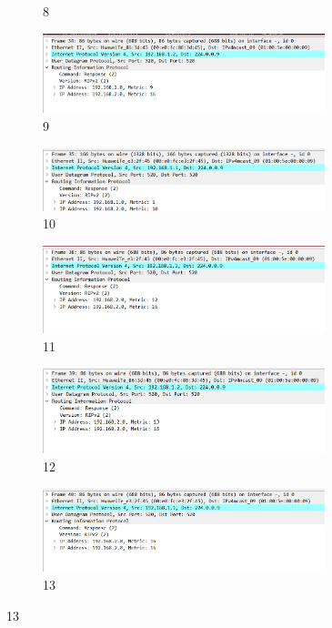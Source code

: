 \documentclass[a4paper,twoside]{article}
\begin{document}
\begin{spacing}{1.2}
\begin{figure}[bp]
\begin{subfigure}{0.4\textwidth}
		\caption{8}
		\label{fig:cti8}
	\end{subfigure}
	\begin{subfigure}{0.4\textwidth}
		\centering
		\includegraphics[width=0.9\textwidth]{9.png}
		\caption{9}
		\label{fig:cti9}
	\end{subfigure}
	\begin{subfigure}{0.4\textwidth}
		\centering
		\includegraphics[width=0.9\textwidth]{10.png}
		\caption{10}
		\label{fig:cti10}
	\end{subfigure}
	\begin{subfigure}{0.4\textwidth}
		\centering
		\includegraphics[width=0.9\textwidth]{11.png}
		\caption{11}
		\label{fig:cti11}
	\end{subfigure}
	\begin{subfigure}{0.4\textwidth}
		\centering
		\includegraphics[width=0.9\textwidth]{12.png}
		\caption{12}
		\label{fig:cti12}
	\end{subfigure}
	\begin{subfigure}{0.4\textwidth}
		\centering
		\includegraphics[width=0.9\textwidth]{13.png}
		\caption{13}
		\label{fig:cti13}
	\end{subfigure}
\end{figure}


\end{spacing}
\end{document}
